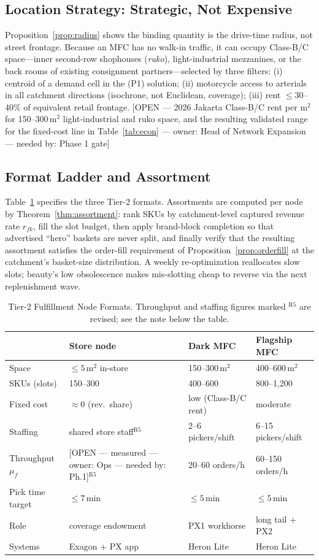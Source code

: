 \documentclass[10pt,twocolumn,letterpaper]{article}
\theoremstyle{definition}
\newcommand{\OPEN}[3]{{\color{openred}\footnotesize\textsf{[OPEN --- #1 --- owner: #2 --- needed by: #3]}}}
\begin{document}
\subsection{Location Strategy: Strategic, Not Expensive}
Proposition~\ref{prop:radius} shows the binding quantity is the drive-time radius, not street frontage. Because an MFC has no walk-in traffic, it can occupy Class-B/C space---inner second-row shophouses (\emph{ruko}), light-industrial mezzanines, or the back rooms of existing consignment partners---selected by three filters: (i) centroid of a demand cell in the (P1) solution; (ii) motorcycle access to arterials in all catchment directions (isochrone, not Euclidean, coverage); (iii) rent $\le30$--40\% of equivalent retail frontage. \OPEN{2026 Jakarta Class-B/C rent per m$^2$ for 150--300\,m$^2$ light-industrial and ruko space, and the resulting validated range for the fixed-cost line in Table~\ref{tab:econ}}{Head of Network Expansion}{Phase 1 gate}

\subsection{Format Ladder and Assortment}
Table~\ref{tab:formats} specifies the three Tier-2 formats. Assortments are computed per node by Theorem~\ref{thm:assortment}: rank SKUs by catchment-level captured revenue rate $r_{fk}$, fill the slot budget, then apply brand-block completion so that advertised ``hero'' baskets are never split, and finally verify that the resulting assortment satisfies the order-fill requirement of Proposition~\ref{prop:orderfill} at the catchment's basket-size distribution. A weekly re-optimization reallocates slow slots; beauty's low obsolescence makes mis-slotting cheap to reverse via the next replenishment wave.

\begin{table}[t]
\caption{Tier-2 Fulfillment Node Formats. Throughput and staffing figures marked $^{\mathrm{R5}}$ are revised; see the note below the table.}
\label{tab:formats}
\centering\footnotesize
\begin{tabular}{@{}lp{1.9cm}p{1.9cm}p{1.9cm}@{}}
\toprule
& \textbf{Store node} & \textbf{Dark MFC} & \textbf{Flagship MFC}\\
\midrule
Space & $\le5$\,m$^2$ in-store & 150--300\,m$^2$ & 400--600\,m$^2$\\
SKUs (slots) & 150--300 & 400--600 & 800--1,200\\
Fixed cost & ${\approx}0$ (rev.\ share) & low (Class-B/C rent) & moderate\\
Staffing & shared store staff$^{\mathrm{R5}}$ & 2--6 pickers/shift & 6--15 pickers/shift\\
Throughput $\mu_f$ & \OPEN{measured}{Ops}{Ph.1}$^{\mathrm{R5}}$ & 20--60 orders/h & 60--150 orders/h\\
Pick time target & $\le7$\,min & $\le5$\,min & $\le5$\,min\\
Role & coverage endowment & PX1 workhorse & long tail + PX2\\
Systems & Exagon + PX app & Heron Lite & Heron Lite\\
\bottomrule
\end{tabular}
\end{table}
\end{document}
